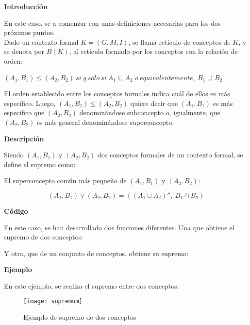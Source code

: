         \textbf{Introducci\'on}
    
        En este caso, se a comenzar con unas definiciones necesarias para los dos pr\'oximos puntos.
        \\

        Dado un contexto formal \( K = (G, M, I) \), se llama ret\'iculo de conceptos de \(K\), y se denota por \( B (K) \), al ret\'iculo 
        formado por los conceptos con la relaci\'on de orden:

        \( (A_{1}, B_{1}) \leq (A_{2}, B_{2}) ~ si ~ y ~ solo ~ si ~ A_{1} \subseteq A_{2} \)
        \( o ~ equivalentemente, ~ B_{1} \supseteq B_{2} \)

        \bigskip


        El orden establecido entre los conceptos formales indica cu\'al de ellos es m\'as espec\'ifico. Luego,  \( (A_{1}, B_{1}) \leq (A_{2}, B_{2})\) 
        quiere decir que  \( (A_{1}, B_{1}) \) es m\'as espec\'ifico que \( (A_{2}, B_{2}) \) denomin\'andose subconcepto o, igualmente, que  
        \( (A_{2}, B_{2}) \) es m\'as general denomin\'andose superconcepto.

        \bigskip


        \textbf{Descripci\'on}

        Siendo \((A_{1}, B_{1}) \) y \((A_{2}, B_{2})\) dos conceptos formales de un contexto formal, se define el supremo como:

        El superconcepto com\'un m\'as peque\~no de \((A_{1}, B_{1}) \) y \((A_{2}, B_{2})\):

        \[ (A_{1}, B_{1}) \vee (A_{2}, B_{2}) = ((A_{1} \cup A_{2})'', ~ B_{1}\cap B_{2}) \]

        \bigskip
        \textbf{C\'odigo}

        En este caso, se han desarrollado dos funciones diferentes. Una que obtiene el supremo de dos conceptos:

        

        Y otra, que de un conjunto de conceptos, obtiene su supremo:

        

        \clearpage

        \textbf{Ejemplo}

        En este ejemplo, se realiza el supremo entre dos conceptos:

        \begin{figure}[H]
            \centering
            \texttt{[image: supremum]}
            \caption{Ejemplo de supremo de dos conceptos}
            \label{fig:supremum}
        \end{figure}


